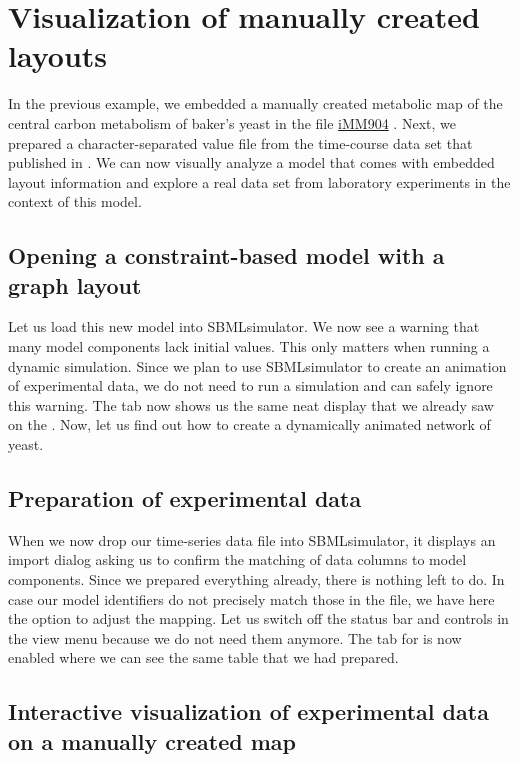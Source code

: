 \chapter{Visualization of manually created layouts}

In the previous example, we embedded a manually created metabolic map of the central carbon metabolism of baker's yeast in the \SBML file \href{https://identifiers.org/bigg.model/iMM904}{iMM904} \citep{Mo2009}.
Next, we prepared a character-separated value file from the time-course data set that \citeauthor{Bergdahl2012} published in \citeyear{Bergdahl2012}.
We can now visually analyze a model that comes with embedded layout information and explore a real data set from laboratory experiments in the context of this model.

\section{Opening a constraint-based model with a graph layout}

Let us load this new model into SBMLsimulator.
We now see a warning that many model components lack initial values.
This only matters when running a dynamic simulation.
Since we plan to use SBMLsimulator to create an animation of experimental data, we do not need to run a simulation and can safely ignore this warning.
The  tab now shows us the same neat display that we already saw on the \BiGG \citep{King2015b, Norsigian2019}.
Now, let us find out how to create a dynamically animated network of yeast.

\section{Preparation of experimental data}

When we now drop our time-series data file into SBMLsimulator, it displays an import dialog asking us to confirm the matching of data columns to model components.
Since we prepared everything already, there is nothing left to do. In case our model identifiers do not precisely match those in the \CSV file, we have here the option to adjust the mapping.
Let us switch off the status bar and controls in the view menu because we do not need them anymore.
The tab for  is now enabled where we can see the same table that we had prepared.

\section{Interactive visualization of experimental data on a manually created map}


